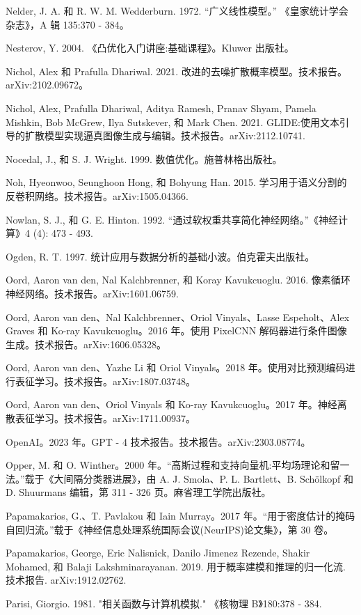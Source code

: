 \documentclass[10pt]{article}
\begin{document}
Nelder, J. A. 和 R. W. M. Wedderburn. 1972. “广义线性模型。” 《皇家统计学会杂志》，A 辑 135:370 - 384。

Nesterov, Y. 2004. 《凸优化入门讲座:基础课程》。Kluwer 出版社。

Nichol, Alex 和 Prafulla Dhariwal. 2021. 改进的去噪扩散概率模型。技术报告。arXiv:2102.09672。

Nichol, Alex, Prafulla Dhariwal, Aditya Ramesh, Pranav Shyam, Pamela Mishkin, Bob McGrew, Ilya Sutskever, 和 Mark Chen. 2021. GLIDE:使用文本引导的扩散模型实现逼真图像生成与编辑。技术报告。arXiv:2112.10741.

Nocedal, J., 和 S. J. Wright. 1999. 数值优化。施普林格出版社。

Noh, Hyeonwoo, Seunghoon Hong, 和 Bohyung Han. 2015. 学习用于语义分割的反卷积网络。技术报告。arXiv:1505.04366.

Nowlan, S. J., 和 G. E. Hinton. 1992. “通过软权重共享简化神经网络。”《神经计算》4 (4): 473 - 493.

Ogden, R. T. 1997. 统计应用与数据分析的基础小波。伯克霍夫出版社。

Oord, Aaron van den, Nal Kalchbrenner, 和 Koray Kavukcuoglu. 2016. 像素循环神经网络。技术报告。arXiv:1601.06759.

Oord, Aaron van den、Nal Kalchbrenner、Oriol Vinyals、Lasse Espeholt、Alex Graves 和 Ko-ray Kavukcuoglu。2016 年。使用 PixelCNN 解码器进行条件图像生成。技术报告。arXiv:1606.05328。

Oord, Aaron van den、Yazhe Li 和 Oriol Vinyals。2018 年。使用对比预测编码进行表征学习。技术报告。arXiv:1807.03748。

Oord, Aaron van den、Oriol Vinyals 和 Ko-ray Kavukcuoglu。2017 年。神经离散表征学习。技术报告。arXiv:1711.00937。

OpenAI。2023 年。GPT - 4 技术报告。技术报告。arXiv:2303.08774。

Opper, M. 和 O. Winther。2000 年。“高斯过程和支持向量机:平均场理论和留一法。”载于《大间隔分类器进展》，由 A. J. Smola、P. L. Bartlett、B. Schölkopf 和 D. Shuurmans 编辑，第 311 - 326 页。麻省理工学院出版社。

Papamakarios, G.、T. Pavlakou 和 Iain Murray。2017 年。“用于密度估计的掩码自回归流。”载于《神经信息处理系统国际会议(NeurIPS)论文集》，第 30 卷。

Papamakarios, George, Eric Nalisnick, Danilo Jimenez Rezende, Shakir Mohamed, 和 Balaji Lakshminarayanan. 2019. 用于概率建模和推理的归一化流. 技术报告. arXiv:1912.02762.

Parisi, Giorgio. 1981. "相关函数与计算机模拟." 《核物理 B》180:378 - 384.
\end{document}
